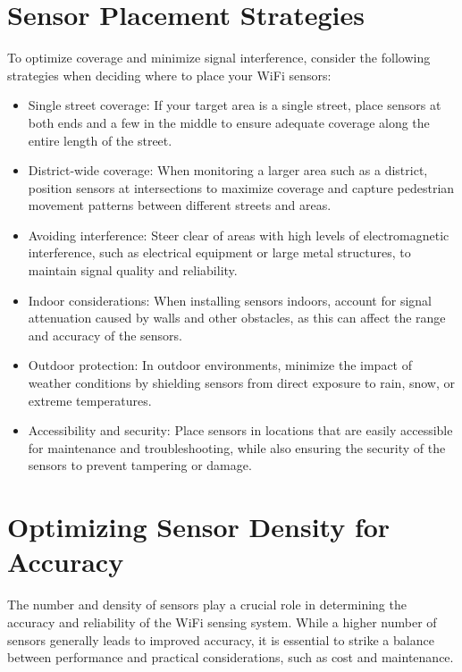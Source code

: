 \documentclass[
  letterpaper,
]{scrbook}
\providecommand{\tightlist}{%
  \setlength{\itemsep}{0pt}\setlength{\parskip}{0pt}}\usepackage{longtable,booktabs,array}
\begin{document}
\section{Sensor Placement Strategies}\label{sensor-placement-strategies}

To optimize coverage and minimize signal interference, consider the
following strategies when deciding where to place your WiFi sensors:

\begin{itemize}
\tightlist
\item
  Single street coverage: If your target area is a single street, place
  sensors at both ends and a few in the middle to ensure adequate
  coverage along the entire length of the street.
\item
  District-wide coverage: When monitoring a larger area such as a
  district, position sensors at intersections to maximize coverage and
  capture pedestrian movement patterns between different streets and
  areas.
\item
  Avoiding interference: Steer clear of areas with high levels of
  electromagnetic interference, such as electrical equipment or large
  metal structures, to maintain signal quality and reliability.
\item
  Indoor considerations: When installing sensors indoors, account for
  signal attenuation caused by walls and other obstacles, as this can
  affect the range and accuracy of the sensors.
\item
  Outdoor protection: In outdoor environments, minimize the impact of
  weather conditions by shielding sensors from direct exposure to rain,
  snow, or extreme temperatures.
\item
  Accessibility and security: Place sensors in locations that are easily
  accessible for maintenance and troubleshooting, while also ensuring
  the security of the sensors to prevent tampering or damage.
\end{itemize}

\section{Optimizing Sensor Density for
Accuracy}\label{optimizing-sensor-density-for-accuracy}

The number and density of sensors play a crucial role in determining the
accuracy and reliability of the WiFi sensing system. While a higher
number of sensors generally leads to improved accuracy, it is essential
to strike a balance between performance and practical considerations,
such as cost and maintenance.
\end{document}
